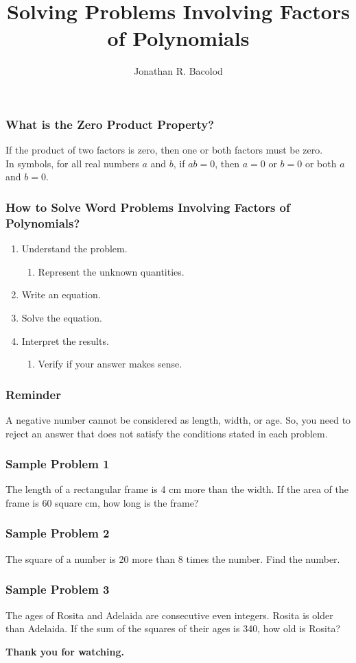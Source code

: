 \documentclass[14pt]{beamer}
\title[] {Solving Problems Involving Factors of Polynomials}
\author{Jonathan R. Bacolod}
\institute[SHS]{Sauyo High School}
\date{}
\begin{document}
	\frame{\titlepage}
	
	\begin{frame}
		\frametitle{What is the Zero Product Property?}
			If the product of two factors is zero, then one or both factors must be zero.\\
			In symbols, for all real numbers $ a $ and $ b $, if $ ab = 0 $, then $ a = 0 $ or $ b = 0 $ or both $ a $ and $ b = 0 $.
	\end{frame}
	
	\begin{frame}
		\frametitle{How to Solve Word Problems Involving Factors of Polynomials?}
		\begin{enumerate}
			\item<1-> Understand the problem.
			\begin{enumerate}
				\item<1-> Represent the unknown quantities.
			\end{enumerate}
		    \item<2-> Write an equation.
		    \item<3-> Solve the equation.
		    \item<4-> Interpret the results.
		    \begin{enumerate}
		    	\item<4-> Verify if your answer makes sense. 
		    \end{enumerate}
		\end{enumerate}	
	\end{frame}

    \begin{frame}
    	\frametitle{Reminder}
    	A negative number cannot be considered as length, width, or
    	age. So, you need to reject an answer that does not satisfy
    	the conditions stated in each problem.
    \end{frame}

   \begin{frame}
   	\frametitle{Sample Problem 1}
   	The length of a rectangular frame is 4 cm more than the width. If the
   	area of the frame is 60 square cm, how long is the frame?
   \end{frame}

    \begin{frame}
    	\frametitle{Sample Problem 2}
    	The square of a number is 20 more than 8 times the number. Find the
    	number.
    \end{frame}

    \begin{frame}
    	\frametitle{Sample Problem 3}
    	The ages of Rosita and Adelaida are consecutive even integers.
    	Rosita is older than Adelaida. If the sum of the squares of their ages is
    	340, how old is Rosita?
    \end{frame}

    \begin{frame}
    	\begin{center}
    		\textbf{\LARGE Thank you for watching.}
    	\end{center}
    \end{frame}
	
\end{document}
